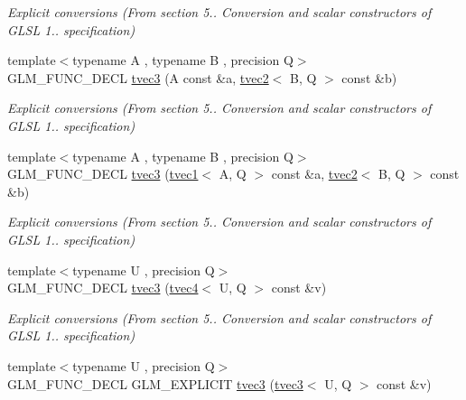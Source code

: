 \begin{DoxyCompactItemize}
\begin{DoxyCompactList}\small\item\em Explicit conversions (From section 5.. Conversion and scalar constructors of G\-L\-S\-L 1.. specification) \end{DoxyCompactList}\item 
\hypertarget{structglm_1_1tvec3_aa9171bfdd41eb93ee43b8c89b8a72bf9}{{\footnotesize template$<$typename A , typename B , precision Q$>$ }\\G\-L\-M\-\_\-\-F\-U\-N\-C\-\_\-\-D\-E\-C\-L \hyperlink{structglm_1_1tvec3_aa9171bfdd41eb93ee43b8c89b8a72bf9}{tvec3} (A const \&a, \hyperlink{structglm_1_1tvec2}{tvec2}$<$ B, Q $>$ const \&b)}\label{structglm_1_1tvec3_aa9171bfdd41eb93ee43b8c89b8a72bf9}

\begin{DoxyCompactList}\small\item\em Explicit conversions (From section 5.. Conversion and scalar constructors of G\-L\-S\-L 1.. specification) \end{DoxyCompactList}\item 
\hypertarget{structglm_1_1tvec3_a3e1f8666e4cfe343b86b7610e05a7cb6}{{\footnotesize template$<$typename A , typename B , precision Q$>$ }\\G\-L\-M\-\_\-\-F\-U\-N\-C\-\_\-\-D\-E\-C\-L \hyperlink{structglm_1_1tvec3_a3e1f8666e4cfe343b86b7610e05a7cb6}{tvec3} (\hyperlink{structglm_1_1tvec1}{tvec1}$<$ A, Q $>$ const \&a, \hyperlink{structglm_1_1tvec2}{tvec2}$<$ B, Q $>$ const \&b)}\label{structglm_1_1tvec3_a3e1f8666e4cfe343b86b7610e05a7cb6}

\begin{DoxyCompactList}\small\item\em Explicit conversions (From section 5.. Conversion and scalar constructors of G\-L\-S\-L 1.. specification) \end{DoxyCompactList}\item 
\hypertarget{structglm_1_1tvec3_a00c684cea5f41272045e8e601d215b43}{{\footnotesize template$<$typename U , precision Q$>$ }\\G\-L\-M\-\_\-\-F\-U\-N\-C\-\_\-\-D\-E\-C\-L \hyperlink{structglm_1_1tvec3_a00c684cea5f41272045e8e601d215b43}{tvec3} (\hyperlink{structglm_1_1tvec4}{tvec4}$<$ U, Q $>$ const \&v)}\label{structglm_1_1tvec3_a00c684cea5f41272045e8e601d215b43}

\begin{DoxyCompactList}\small\item\em Explicit conversions (From section 5.. Conversion and scalar constructors of G\-L\-S\-L 1.. specification) \end{DoxyCompactList}\item 
\hypertarget{structglm_1_1tvec3_a0c5689584d9f174f88fb0dea6e510adb}{{\footnotesize template$<$typename U , precision Q$>$ }\\G\-L\-M\-\_\-\-F\-U\-N\-C\-\_\-\-D\-E\-C\-L G\-L\-M\-\_\-\-E\-X\-P\-L\-I\-C\-I\-T \hyperlink{structglm_1_1tvec3_a0c5689584d9f174f88fb0dea6e510adb}{tvec3} (\hyperlink{structglm_1_1tvec3}{tvec3}$<$ U, Q $>$ const \&v)}\label{structglm_1_1tvec3_a0c5689584d9f174f88fb0dea6e510adb}


\end{DoxyCompactItemize}
